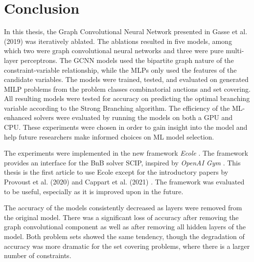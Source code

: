 \chapter{Conclusion}\label{cha:conclusion}

In this thesis, the Graph Convolutional Neural Network presented in Gasse et al. (2019) \cite{gasse2019exact} was iteratively ablated. The ablations resulted in five models, among which two were graph convolutional neural networks and three were pure multi-layer perceptrons. The \gls{GCNN} models used the bipartite graph nature of the constraint-variable relationship, while the \gls{MLP}s only used the features of the candidate variables. The models were trained, tested, and evaluated on generated \gls{MILP} problems from the problem classes combinatorial auctions and set covering. All resulting models were tested for accuracy on predicting the optimal branching variable according to the Strong Branching algorithm. The efficiency of the \gls{ML}-enhanced solvers were evaluated by running the models on both a \gls{GPU} and \gls{CPU}. These experiments were chosen in order to gain insight into the model and help future researchers make informed choices on \gls{ML} model selection. 

The experiments were implemented in the new framework \textit{\gls{Ecole}} \cite{prouvost2020ecole}. The framework provides an interface for the \gls{BnB} solver \gls{SCIP}, inspired by \textit{OpenAI Gym} \cite{brockman2016openai}.  
This thesis is the first article to use \gls{Ecole} except for the introductory papers by Provoust et al. (2020) \cite{prouvost2020ecole} and Cappart et al. (2021) \cite{cappart2021combinatorial}. The framework was evaluated to be useful, especially as it is improved upon in the future.

The accuracy of the models consistently decreased as layers were removed from the original model. There was a significant loss of accuracy after removing the graph convolutional component as well as after removing all hidden layers of the model. Both problem sets showed the same tendency, though the degradation of accuracy was more dramatic for the set covering problems, where there is a larger number of constraints.  

